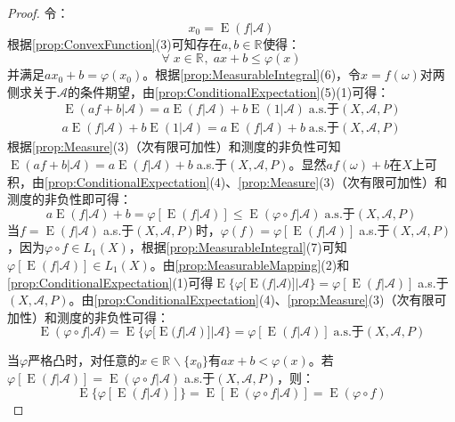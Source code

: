 \begin{proof}
	令：
	\begin{equation*}
		x_0=\operatorname{E}(f|\mathscr{A})
	\end{equation*}
	根据\cref{prop:ConvexFunction}(3)可知存在$a,b\in\mathbb{R}^{}$使得：
	\begin{equation*}
		\forall\;x\in\mathbb{R}^{},\;ax+b\leqslant\varphi(x)
	\end{equation*}
	并满足$ax_0+b=\varphi(x_0)$。根据\cref{prop:MeasurableIntegral}(6)，令$x=f(\omega)$对两侧求关于$\mathscr{A}$的条件期望，由\cref{prop:ConditionalExpectation}(5)(1)可得：
	\begin{gather*}
		\operatorname{E}(af+b|\mathscr{A})=a\operatorname{E}(f|\mathscr{A})+b\operatorname{E}(1|\mathscr{A})\;\text{a.s.于}(X,\mathscr{A},P) \\ a\operatorname{E}(f|\mathscr{A})+b\operatorname{E}(1|\mathscr{A})=a\operatorname{E}(f|\mathscr{A})+b\;\text{a.s.于}(X,\mathscr{A},P)
	\end{gather*}
	根据\cref{prop:Measure}(3)（次有限可加性）和测度的非负性可知$\operatorname{E}(af+b|\mathscr{A})=a\operatorname{E}(f|\mathscr{A})+b\;$a.s.于$(X,\mathscr{A},P)$。显然$af(\omega)+b$在$X$上可积，由\cref{prop:ConditionalExpectation}(4)、\cref{prop:Measure}(3)（次有限可加性）和测度的非负性即可得：
	\begin{equation*}
		a\operatorname{E}(f|\mathscr{A})+b=\varphi[\operatorname{E}(f|\mathscr{A})]\leqslant\operatorname{E}(\varphi\circ f|\mathscr{A})\;\text{a.s.于}(X,\mathscr{A},P)
	\end{equation*}
	当$f=\operatorname{E}(f|\mathscr{A})\;$a.s.于$(X,\mathscr{A},P)$时，$\varphi(f)=\varphi[\operatorname{E}(f|\mathscr{A})]\;$a.s.于$(X,\mathscr{A},P)$，因为$\varphi\circ f\in L_1(X)$，根据\cref{prop:MeasurableIntegral}(7)可知$\varphi[\operatorname{E}(f|\mathscr{A})]\in L_1(X)$。由\cref{prop:MeasurableMapping}(2)和\cref{prop:ConditionalExpectation}(1)可得$\operatorname{E}\{\varphi[\operatorname{E}(f|\mathscr{A})]|\mathscr{A}\}=\varphi[\operatorname{E}(f|\mathscr{A})]\;$a.s.于$(X,\mathscr{A},P)$。由\cref{prop:ConditionalExpectation}(4)、\cref{prop:Measure}(3)（次有限可加性）和测度的非负性可得：
	\begin{equation*}
		\operatorname{E}(\varphi\circ f|\mathscr{A})=\operatorname{E}\{\varphi[\operatorname{E}(f|\mathscr{A})]|\mathscr{A}\}=\varphi[\operatorname{E}(f|\mathscr{A})]\;\text{a.s.于}(X,\mathscr{A},P)
	\end{equation*}\par
	当$\varphi$严格凸时，对任意的$x\in\mathbb{R}^{}\backslash\{x_0\}$有$ax+b<\varphi(x)$。若$\varphi[\operatorname{E}(f|\mathscr{A})]=\operatorname{E}(\varphi\circ f|\mathscr{A})\;$a.s.于$(X,\mathscr{A},P)$，则：
	\begin{equation*}
		\operatorname{E}\{\varphi[\operatorname{E}(f|\mathscr{A})]\}=\operatorname{E}[\operatorname{E}(\varphi\circ f|\mathscr{A})]=\operatorname{E}(\varphi\circ f)
	\end{equation*}
\end{proof}

